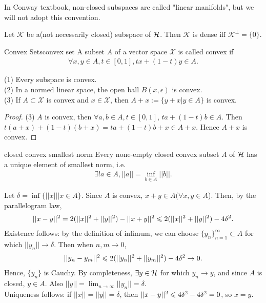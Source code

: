 In Conway textbook, non-closed subspaces are called "linear manifolds", but we will not adopt this convention.

\begin{proposition}{}{}
    Let $\mathcal{K}$ be a(not necessarily closed) subspace of $\mathcal{H}$. Then $\mathcal{K}$ is dense iff $\mathcal{K}^{\perp}=\{0\}$.
\end{proposition}


\begin{definition}{Convex Sets}{convex set}
    A subset $A$ of a vector space $\mathcal{X}$ is called convex if 
    \begin{align*}
        \forall x,y\in A, t\in [0,1], tx+(1-t)y\in A.
    \end{align*}
\end{definition}

\begin{proposition}{}{}
    (1) Every subspace is convex.\\
    (2) In a normed linear space, the open ball $B(x,\epsilon)$ is convex.\\
    (3) If $A\subset\mathcal{X}$ is convex and $x\in \mathcal{X}$, then $A+x:=\{y+x|y\in A\}$ is convex.
\end{proposition}
\begin{proof}
    (3) $A$ is convex, then $\forall a,b\in A, t\in[0,1]$, $ta+(1-t)b\in A$. Then $t(a+x)+(1-t)(b+x)=ta+(1-t)b+x\in A+x$.
    Hence $A+x$ is convex.
\end{proof}
\begin{theorem}{}{closed convex smallest norm}
    Every none-empty closed convex subset $A$ of $\mathcal{H}$ has a unique element of smallest norm, i.e.
    \begin{align*}
        \exists ! a\in A, ||a|| = \inf_{b\in A}||b||.
    \end{align*}
\end{theorem}

\begin{proofsolution}
    Let $\delta=\inf\{||x|||x\in A\}$. Since $A$ is convex, $x+y\in A(\forall x,y\in A$). Then, by the parallelogram law,
    \begin{align*}
        ||x-y||^2=2(||x||^2+||y||^2)-||x+y||^2\leqslant 2(||x||^2+||y||^2)-4\delta^2.
    \end{align*}
    Existence follows: by the definition of infimum, we can choose $\{y_n\}_{n=1}^{\infty}\subset A$ for which $||y_n||\rightarrow \delta$. 
    Then when $n,m\rightarrow 0$,
    \begin{align*}
        ||y_n-y_m||^2\leqslant 2(||y_n||^2+||y_m||^2)-4\delta^2\rightarrow 0.
    \end{align*}
    Hence, $\{y_n\}$ is Cauchy. By completeness, $\exists y\in \mathcal{H}$ for which $y_n\rightarrow y$, and since $A$ is closed, $y\in A$. 
    Also $||y||=\lim_{n\rightarrow \infty} ||y_n||=\delta$. \\
    Uniqueness follows: if $||x||=||y||=\delta$, then $||x-y||^2\leqslant 4\delta^2-4\delta^2=0$, so $x=y$.
\end{proofsolution}

